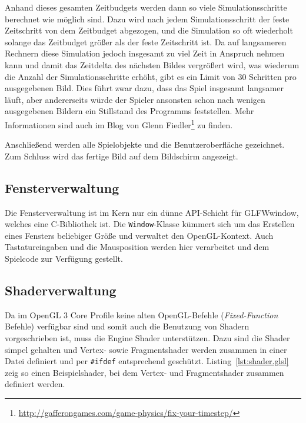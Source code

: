 \documentclass[12pt, a4paper, titlepage, hidelinks]{scrreprt}
\begin{document}
Anhand dieses gesamten Zeitbudgets werden dann so viele Simulationsschritte berechnet wie möglich sind. Dazu wird nach jedem Simulationsschritt der feste Zeitschritt von dem Zeitbudget abgezogen, und die Simulation so oft wiederholt solange das Zeitbudget größer als der feste Zeitschritt ist. Da auf langsameren Rechnern diese Simulation jedoch insgesamt zu viel Zeit in Anspruch nehmen kann und damit das Zeitdelta des nächsten Bildes vergrößert wird, was wiederum die Anzahl der Simulationsschritte erhöht, gibt es ein Limit von 30 Schritten pro ausgegebenen Bild. Dies führt zwar dazu, dass das Spiel insgesamt langsamer läuft, aber andererseits würde der Spieler ansonsten schon nach wenigen ausgegebenen Bildern ein Stillstand des Programms feststellen. Mehr Informationen sind auch im Blog von Glenn Fiedler\footnote{\url{http://gafferongames.com/game-physics/fix-your-timestep/}} zu finden.

Anschließend werden alle Spielobjekte und die Benutzeroberfläche gezeichnet. Zum Schluss wird das fertige Bild auf dem Bildschirm angezeigt.


\subsection{Fensterverwaltung}

Die Fensterverwaltung ist im Kern nur ein dünne API-Schicht für GLFWwindow, welches eine C-Bibliothek ist. Die \texttt{Window}-Klasse kümmert sich um das Erstellen eines Fensters beliebiger Größe und verwaltet den OpenGL-Kontext. Auch Tastatureingaben und die Mausposition werden hier verarbeitet und dem Spielcode zur Verfügung gestellt.


\subsection{Shaderverwaltung}

Da im OpenGL 3 Core Profile keine alten OpenGL-Befehle (\textit{Fixed-Function} Befehle) verfügbar sind und somit auch die Benutzung von Shadern vorgeschrieben ist, muss die Engine Shader unterstützen. Dazu sind die Shader simpel gehalten und Vertex- sowie Fragmentshader werden zusammen in einer Datei definiert und per \texttt{\#ifdef} entsprechend geschützt. Listing~\autoref{lst:shader.glsl} zeig so einen Beispielshader, bei dem Vertex- und Fragmentshader zusammen definiert werden. 
\end{document}
